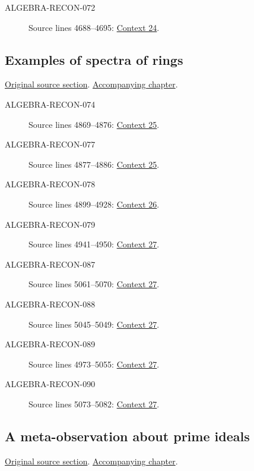 \begin{description}
\item[ALGEBRA-RECON-072] Source lines 4688--4695: \hyperlink{algebra-context-024}{Context 24}.
\end{description}

\subsection{Examples of spectra of rings}
\hypertarget{algebra-source-section-examples-spectra}{}
\noindent\href{https://github.com/stacks/stacks-project/blob/a04446e57ec1fbc252a871afcec7752fb2807b14/algebra.tex\#L4816}{Original source section}. \href{algebra.pdf\#nameddest=section-examples-spectra}{Accompanying chapter}.

\begin{description}
\item[ALGEBRA-RECON-074] Source lines 4869--4876: \hyperlink{algebra-context-025}{Context 25}.
\item[ALGEBRA-RECON-077] Source lines 4877--4886: \hyperlink{algebra-context-025}{Context 25}.
\item[ALGEBRA-RECON-078] Source lines 4899--4928: \hyperlink{algebra-context-026}{Context 26}.
\item[ALGEBRA-RECON-079] Source lines 4941--4950: \hyperlink{algebra-context-027}{Context 27}.
\item[ALGEBRA-RECON-087] Source lines 5061--5070: \hyperlink{algebra-context-027}{Context 27}.
\item[ALGEBRA-RECON-088] Source lines 5045--5049: \hyperlink{algebra-context-027}{Context 27}.
\item[ALGEBRA-RECON-089] Source lines 4973--5055: \hyperlink{algebra-context-027}{Context 27}.
\item[ALGEBRA-RECON-090] Source lines 5073--5082: \hyperlink{algebra-context-027}{Context 27}.
\end{description}

\subsection{A meta-observation about prime ideals}
\hypertarget{algebra-source-section-oka-families}{}
\noindent\href{https://github.com/stacks/stacks-project/blob/a04446e57ec1fbc252a871afcec7752fb2807b14/algebra.tex\#L5089}{Original source section}. \href{algebra.pdf\#nameddest=section-oka-families}{Accompanying chapter}.


